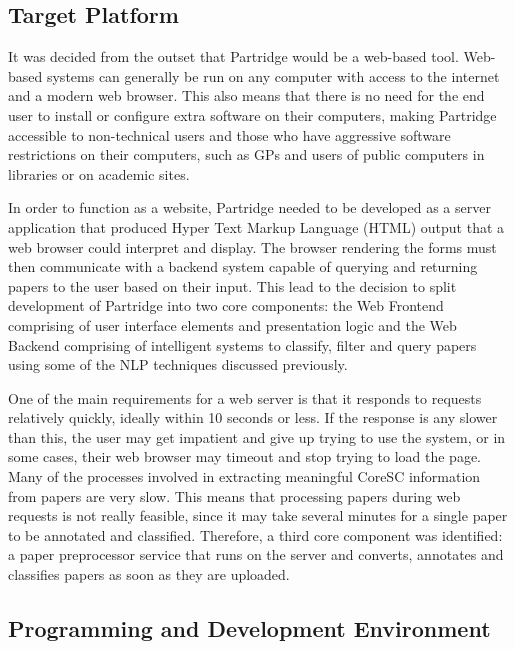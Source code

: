 \subsection{Target Platform}

It was decided from the outset that Partridge would be a web-based tool.
Web-based systems can generally be run on any computer with access to the
internet and a modern web browser. This also means that there is no need for
the end user to install or configure extra software on their computers, making
Partridge accessible to non-technical users and those who have aggressive
software restrictions on their computers, such as GPs and users of public
computers in libraries or on academic sites.

In order to function as a website, Partridge needed to be developed as a server
application that produced Hyper Text Markup Language (HTML) output that a web
browser could interpret and display. The browser rendering the forms must then
communicate with a backend system capable of querying and returning papers to
the user based on their input. This lead to the decision to split development
of Partridge into two core components: the Web Frontend comprising of user
interface elements and presentation logic and the Web Backend comprising of
intelligent systems to classify, filter and query papers using some of the NLP
techniques discussed previously.

One of the main requirements for a web server is that it responds to requests
relatively quickly, ideally within 10 seconds or less. If the response is any
slower than this, the user may get impatient and give up trying to use the
system, or in some cases, their web browser may timeout and stop trying to load
the page. Many of the processes involved in extracting meaningful CoreSC
information from papers are very slow. This means that processing papers
during web requests is not really feasible, since it may take several minutes
for a single paper to be annotated and classified. Therefore, a third core
component was identified: a paper preprocessor service that runs on the server
and converts, annotates and classifies papers as soon as they are uploaded.

\subsection{ Programming and Development Environment }

